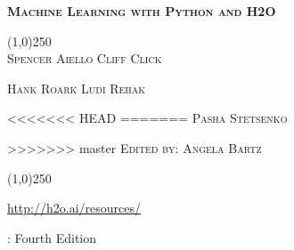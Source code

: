 %









\thispagestyle{empty} %


\begin{center}
\textsc{\Large\bf{Machine Learning with Python and H2O}}

\bigskip
\line(1,0){250}  %
\\
\bigskip
\small
\textsc{Spencer Aiello \hspace{10pt} Cliff Click  \hspace{10pt} }

\textsc{Hank Roark  \hspace{10pt} Ludi Rehak}

<<<<<<< HEAD
=======
\textsc{Pasha Stetsenko}

>>>>>>> master
\textsc{Edited by: Angela Bartz}

\normalsize

\line(1,0){250}  %

{\url{http://h2o.ai/resources/}}

\bigskip

\monthname \hspace{1pt}  \the\year: Fourth Edition

\bigskip
\end{center}


